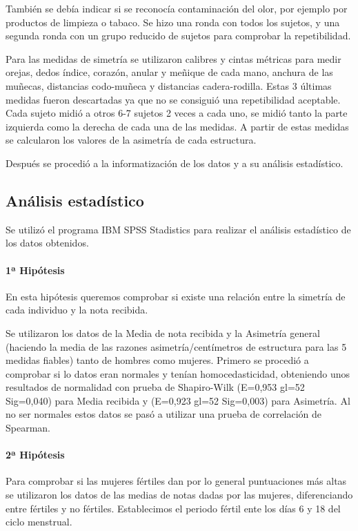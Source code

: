 \documentclass[fleqn,10pt]{SelfArx} %
\begin{document}
También se debía indicar si se reconocía contaminación del olor, por ejemplo por productos de limpieza o tabaco.
Se hizo una ronda con todos los sujetos, y una segunda ronda con un grupo reducido de sujetos para comprobar la repetibilidad.

Para las medidas de simetría se utilizaron calibres y cintas métricas para medir orejas, dedos índice, corazón, anular y meñique de cada mano, anchura de las muñecas, distancias codo-muñeca y distancias cadera-rodilla. Estas 3 últimas medidas fueron descartadas ya que no se consiguió una repetibilidad aceptable. Cada sujeto midió a otros 6-7 sujetos 2 veces a cada uno, se midió tanto la parte izquierda como la derecha de cada una de las medidas. A partir de estas medidas se calcularon los valores de la asimetría de cada estructura.

Después se procedió a la informatización de los datos y a su análisis estadístico.

\subsection{Análisis estadístico}

Se utilizó el programa IBM SPSS Stadistics para realizar el análisis estadístico de los datos obtenidos.

\paragraph{1ª Hipótesis} 

En esta hipótesis queremos comprobar si existe una relación entre la simetría de cada individuo y la nota recibida.

Se utilizaron los datos de la Media de nota recibida y la Asimetría general (haciendo la media de las razones asimetría/centímetros de estructura para las 5 medidas fiables) tanto de hombres como mujeres. Primero se procedió a comprobar si lo datos eran normales y tenían homocedasticidad, obteniendo unos resultados de normalidad con prueba de Shapiro-Wilk (E=0,953 gl=52 Sig=0,040) para Media recibida y (E=0,923 gl=52 Sig=0,003) para Asimetría. Al no ser normales estos datos se pasó a utilizar una prueba de correlación de Spearman.

\paragraph{2ª Hipótesis} 

Para comprobar si las mujeres fértiles dan por lo general puntuaciones más altas se utilizaron los datos de las medias de notas dadas por las mujeres, diferenciando entre fértiles y no fértiles. Establecimos el periodo fértil ente los días 6 y 18 del ciclo menstrual.
\end{document}
